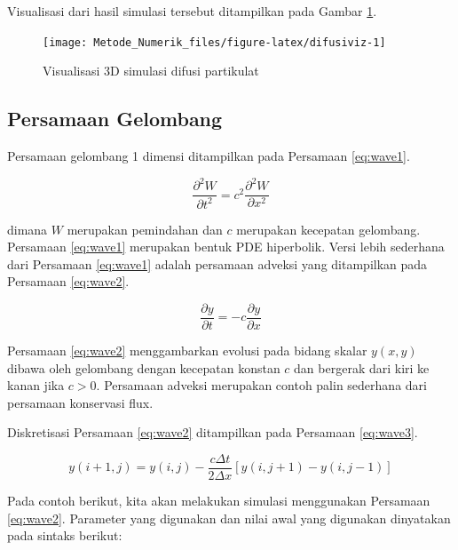 \documentclass[]{book}
\theoremstyle{definition}
\theoremstyle{definition}
\theoremstyle{definition}
\theoremstyle{remark}
\begin{document}
Visualisasi dari hasil simulasi tersebut ditampilkan pada Gambar \ref{fig:difusiviz}.

\begin{figure}

{\centering \texttt{[image: Metode\_Numerik\_files/figure-latex/difusiviz-1]} 

}

\caption{Visualisasi 3D simulasi difusi partikulat}\label{fig:difusiviz}
\end{figure}

\hypertarget{persamaan-gelombang}{%
\subsection{Persamaan Gelombang}\label{persamaan-gelombang}}

Persamaan gelombang 1 dimensi ditampilkan pada Persamaan \eqref{eq:wave1}.

\begin{equation}
\frac{\partial^2W}{\partial t^2}=c^2\frac{\partial^2W}{\partial x^2}
  \label{eq:wave1}
\end{equation}

dimana \(W\) merupakan pemindahan dan \(c\) merupakan kecepatan gelombang. Persamaan \eqref{eq:wave1} merupakan bentuk PDE hiperbolik. Versi lebih sederhana dari Persamaan \eqref{eq:wave1} adalah persamaan adveksi yang ditampilkan pada Persamaan \eqref{eq:wave2}.

\begin{equation}
\frac{\partial y}{\partial t}=-c\frac{\partial y}{\partial x}
  \label{eq:wave2}
\end{equation}

Persamaan \eqref{eq:wave2} menggambarkan evolusi pada bidang skalar \(y\left(x,y\right)\) dibawa oleh gelombang dengan kecepatan konstan \(c\) dan bergerak dari kiri ke kanan jika \(c>0\). Persamaan adveksi merupakan contoh palin sederhana dari persamaan konservasi flux.

Diskretisasi Persamaan \eqref{eq:wave2} ditampilkan pada Persamaan \eqref{eq:wave3}.

\begin{equation}
y\left(i+1,j\right)=y\left(i,j\right)-\frac{c\Delta t}{2\Delta x}\left[y\left(i,j+1\right)-y\left(i,j-1\right)\right]
  \label{eq:wave3}
\end{equation}

Pada contoh berikut, kita akan melakukan simulasi menggunakan Persamaan \eqref{eq:wave2}. Parameter yang digunakan dan nilai awal yang digunakan dinyatakan pada sintaks berikut:
\end{document}
